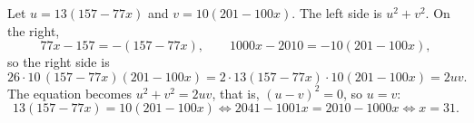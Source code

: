 Let $u=13(157-77x)$ and $v=10(201-100x)$. The left side is $u^2+v^2$. On the right,
\[77x-157=-(157-77x),\qquad 1000x-2010=-10(201-100x),\]
so the right side is
\[26\cdot10\,(157-77x)(201-100x)=2\cdot13(157-77x)\cdot10(201-100x)=2uv .\]
The equation becomes $u^2+v^2=2uv$, that is, $(u-v)^2=0$, so $u=v$:
\[13(157-77x)=10(201-100x)\iff2041-1001x=2010-1000x\iff x=\boxed{31}.\]
